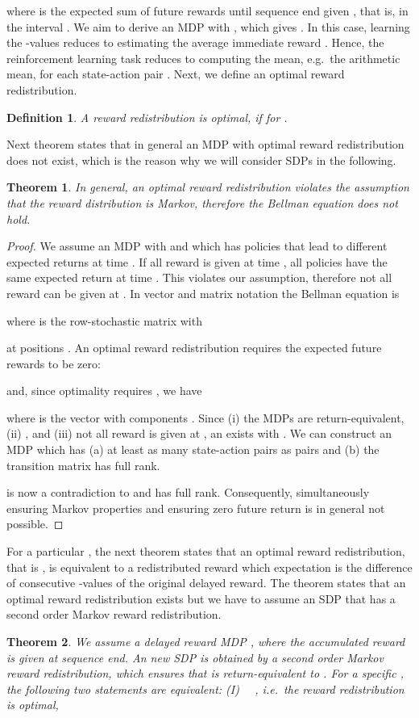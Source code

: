 \documentclass{article}
\newtheorem{theoremA}{Theorem}
\newtheorem{definitionA}{Definition}
\begin{document}
\begin{appendices}
where  
is the expected sum of future rewards until sequence end given , 
that is, in the interval . 
We aim to derive an MDP with ,
which gives .
In this case, 
learning the -values reduces to estimating the average immediate reward
.
Hence, the reinforcement learning task reduces to computing 
the mean, e.g.\ the arithmetic mean, for each
state-action pair .
Next, we define an optimal reward redistribution.
\begin{definitionA}
A reward redistribution is optimal,  
if   for .
\end{definitionA}

Next theorem states that in general an MDP with optimal reward
redistribution does not exist, which
is the reason why we will consider SDPs in the following.
\begin{theoremA}
\label{th:Aviolate}
In general, an optimal reward redistribution violates
the assumption that the reward distribution is Markov, 
therefore the Bellman equation does not hold.
\end{theoremA}

\begin{proof}
We assume an MDP  with
 and which has policies
that lead to different expected returns at time .
If all reward is given at time , 
all policies have the same expected return at time .
This violates our assumption, therefore not all reward can 
be given at .
In vector and matrix notation the Bellman equation is

where  is the row-stochastic matrix with
 
at positions .
An optimal reward redistribution requires the 
expected future rewards to be zero:

and, since optimality requires ,
we have

where  is the vector 
with components .
Since (i) the MDPs are return-equivalent, 
(ii) , 
and (iii) not all reward is given at ,
an  exists with .
We can construct an MDP  which has
(a) at least as many state-action pairs  
as pairs  and (b) the transition matrix
 has full rank.
 
is now a contradiction to
 and 
 has full rank.
Consequently, simultaneously ensuring Markov properties 
and ensuring zero future return
is in general not possible.
\end{proof}


For a particular ,
the next theorem states that an optimal reward redistribution,
that is , is equivalent to 
a redistributed reward which expectation is the difference of
consecutive -values of the original delayed reward.
The theorem states that an optimal reward redistribution exists but
we have to assume an SDP  that has a
second order Markov reward redistribution.
\begin{theoremA}
\label{th:AzeroExp}
We assume a delayed reward MDP , 
where the accumulated reward is given at sequence end.
An new SDP  is obtained by a 
second order Markov reward redistribution,
which ensures that  is return-equivalent to .
For a specific , the following two
statements are equivalent:
(I) ~~, i.e.\ the reward redistribution is optimal, 


\end{theoremA}
\end{appendices}
\end{document}
